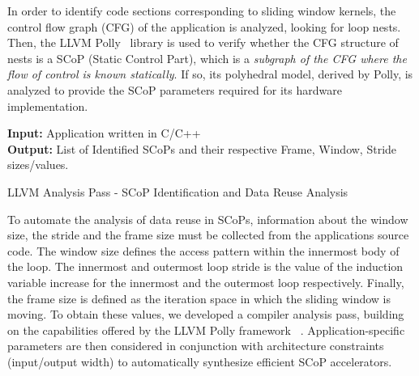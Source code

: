 \documentclass[]{usiinfthesis}
\begin{document}
In order to identify code sections corresponding to sliding window
kernels, the control flow graph (CFG) of the application is analyzed,
looking for loop nests. Then, the LLVM Polly~\cite{GrosserApr12}
library is used to verify whether the CFG structure of nests is a SCoP
(Static Control Part), which is a \emph{subgraph of the CFG where the
  flow of control is known statically}.  If so, its polyhedral model,
derived by Polly, is analyzed to provide the SCoP parameters required
for its hardware implementation.

\begin{algorithm}[t]
\begin{flushleft}
\textbf{Input:}  Application written in C/C++\\
\textbf{Output:} List of Identified SCoPs and their respective Frame, Window, Stride sizes/values.\\
\end{flushleft}
\begin{algorithmic}[1]
  \State{}
  \State{}
  \State{}
\EndFunction
\State
{}
  \State{}
  \State{}
    \State{}
    \State{}
    \State{}
    \State{}
    \State{}
  \EndIf
\EndFunction
\end{algorithmic}
\caption{LLVM Analysis Pass - SCoP Identification and 
Data Reuse Analysis}
\label{dr_Algo}
\end{algorithm}

To automate the analysis of data reuse in SCoPs, information about the
window size, the stride and the frame size must be collected from the
applications source code. The window size defines the access pattern
within the innermost body of the loop.  The innermost and outermost
loop stride is the value of the induction variable increase for the innermost
and the outermost loop respectively. Finally, the frame size is
defined as the iteration space in which the sliding window is
moving. To obtain these values, we developed a compiler analysis pass,
building on the capabilities offered by the LLVM Polly framework
~\cite{GrosserApr12}. Application-specific parameters are then
considered in conjunction with architecture constraints (input/output
width) to automatically synthesize
efficient SCoP accelerators.\par
\end{document}
